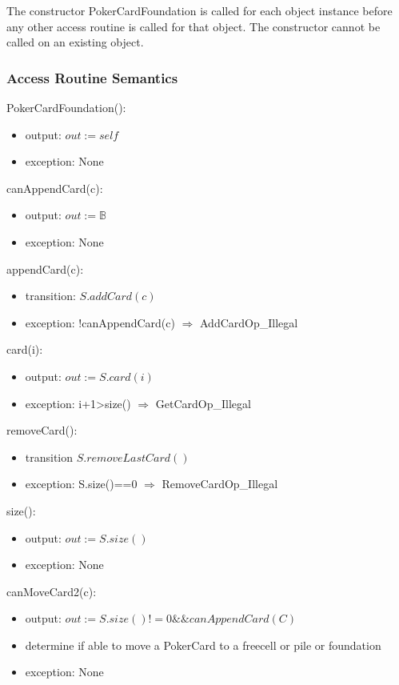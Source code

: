 \documentclass[12pt]{article}
\begin{document}
The constructor PokerCardFoundation is called for each object instance before any other
access routine is called for that object.  The constructor cannot be called on
an existing object.

\subsubsection* {Access Routine Semantics}

PokerCardFoundation():
\begin{itemize}
\item output: $out := \mathit{self}$
\item exception: None
\end{itemize}

\noindent canAppendCard(c):
\begin{itemize}
\item output: $out := \mathbb{B}$
\item exception: None
\end{itemize}

\noindent appendCard(c):
\begin{itemize}
\item transition: $S.addCard(c)$
\item exception: !canAppendCard(c) $\Rightarrow$ AddCardOp\_Illegal
\end{itemize}

\noindent card(i):
\begin{itemize}
\item output: $out := S.card(i)$
\item exception: i+1>size() $\Rightarrow$ GetCardOp\_Illegal
\end{itemize}

\noindent removeCard():
\begin{itemize}
\item transition $S.removeLastCard()$
\item exception: S.size()==0 $\Rightarrow$ RemoveCardOp\_Illegal
\end{itemize}

\noindent size():
\begin{itemize}
\item output: $out := S.size()$
\item exception: None
\end{itemize}

\noindent canMoveCard2(c):
\begin{itemize}
\item output: $out := S.size()!=0 \&\& canAppendCard(C)$
\item determine if able to move a PokerCard to a freecell or pile or foundation
\item exception: None
\end{itemize}
\end{document}
